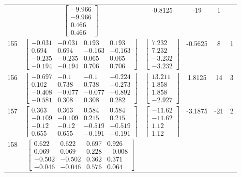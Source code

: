 \documentclass[a4paper,12pt]{article}
\begin{document}
\begin{tabular}{c c c c c c}
&
$\begin{bmatrix} -9.966 \\ -9.966 \\ 0.466 \\ 0.466 \end{bmatrix}$
&
-0.8125
&
-19
&
1
\\
155
&
$\begin{bmatrix} -0.031 & -0.031 & 0.193 & 0.193 \\ 0.694 & 0.694 & -0.163 & -0.163 \\ -0.235 & -0.235 & 0.065 & 0.065 \\ -0.194 & -0.194 & 0.706 & 0.706 \end{bmatrix}$
&
$\begin{bmatrix} 7.232 \\ 7.232 \\ -3.232 \\ -3.232 \end{bmatrix}$
&
-0.5625
&
8
&
1
\\
156
&
$\begin{bmatrix} -0.697 & -0.1 & -0.1 & -0.224 \\ 0.102 & 0.738 & 0.738 & -0.273 \\ -0.408 & -0.077 & -0.077 & -0.892 \\ -0.581 & 0.308 & 0.308 & 0.282 \end{bmatrix}$
&
$\begin{bmatrix} 13.211 \\ 1.858 \\ 1.858 \\ -2.927 \end{bmatrix}$
&
1.8125
&
14
&
3
\\
157
&
$\begin{bmatrix} 0.363 & 0.363 & 0.584 & 0.584 \\ -0.109 & -0.109 & 0.215 & 0.215 \\ -0.12 & -0.12 & -0.519 & -0.519 \\ 0.655 & 0.655 & -0.191 & -0.191 \end{bmatrix}$
&
$\begin{bmatrix} -11.62 \\ -11.62 \\ 1.12 \\ 1.12 \end{bmatrix}$
&
-3.1875
&
-21
&
2
\\
158
&
$\begin{bmatrix} 0.622 & 0.622 & 0.697 & 0.926 \\ 0.069 & 0.069 & 0.228 & -0.008 \\ -0.502 & -0.502 & 0.362 & 0.371 \\ -0.046 & -0.046 & 0.576 & 0.064 \end{bmatrix}$

\end{tabular}
\end{document}
